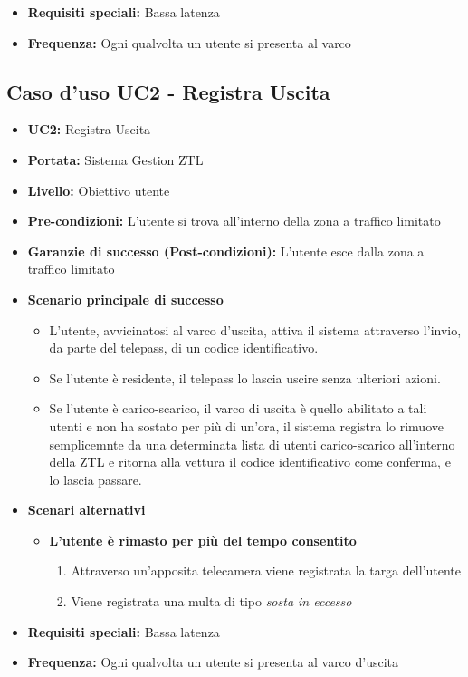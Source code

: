 \documentclass[12pt, letterpaper]{article}
\begin{document}
\begin{itemize}
\item \textbf{Requisiti speciali:} Bassa latenza
\item \textbf{Frequenza:} Ogni qualvolta un utente si presenta al varco
\end{itemize}

\subsection{Caso d'uso UC2 - Registra Uscita}
\begin{itemize}
\item \textbf{UC2:} Registra Uscita
\item \textbf{Portata:} Sistema Gestion ZTL
\item \textbf{Livello:} Obiettivo utente
\item \textbf{Pre-condizioni:} L'utente si trova all'interno della zona a traffico limitato
\item \textbf{Garanzie di successo (Post-condizioni):} L'utente esce dalla zona a traffico limitato
\item \textbf{Scenario principale di successo}
\begin{itemize}
    \item L'utente, avvicinatosi al varco d'uscita, attiva il sistema attraverso l'invio, da parte del telepass, di un codice identificativo.
    \item Se l'utente è residente, il telepass lo lascia uscire senza ulteriori azioni.
    \item Se l'utente è carico-scarico, il varco di uscita è quello abilitato a tali utenti e non ha sostato per più di un'ora, il sistema registra lo rimuove semplicemnte da una determinata lista di utenti carico-scarico all'interno della ZTL e ritorna alla vettura il codice identificativo come conferma, e lo lascia passare.
\end{itemize}    
\item \textbf{Scenari alternativi}
\begin{itemize}
    \item \textbf{L'utente è rimasto per più del tempo consentito}
    \begin{enumerate}
        \item Attraverso un'apposita telecamera viene registrata la targa dell'utente
        \item Viene registrata una multa di tipo \emph{sosta in eccesso}
    \end{enumerate}
\end{itemize}

\item \textbf{Requisiti speciali:} Bassa latenza
\item \textbf{Frequenza:} Ogni qualvolta un utente si presenta al varco d'uscita 
\end{itemize}
\end{document}
